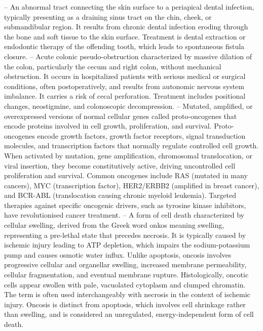 -- An abnormal tract connecting the skin surface to a periapical dental infection, typically presenting as a draining sinus tract on the chin, cheek, or submandibular region. It results from chronic dental infection eroding through the bone and soft tissue to the skin surface. Treatment is dental extraction or endodontic therapy of the offending tooth, which leads to spontaneous fistula closure.
-- Acute colonic pseudo-obstruction characterized by massive dilation of the colon, particularly the cecum and right colon, without mechanical obstruction. It occurs in hospitalized patients with serious medical or surgical conditions, often postoperatively, and results from autonomic nervous system imbalance. It carries a risk of cecal perforation. Treatment includes positional changes, neostigmine, and colonoscopic decompression.
-- Mutated, amplified, or overexpressed versions of normal cellular genes called proto-oncogenes that encode proteins involved in cell growth, proliferation, and survival. Proto-oncogenes encode growth factors, growth factor receptors, signal transduction molecules, and transcription factors that normally regulate controlled cell growth. When activated by mutation, gene amplification, chromosomal translocation, or viral insertion, they become constitutively active, driving uncontrolled cell proliferation and survival. Common oncogenes include RAS (mutated in many cancers), MYC (transcription factor), HER2/ERBB2 (amplified in breast cancer), and BCR-ABL (translocation causing chronic myeloid leukemia). Targeted therapies against specific oncogenic drivers, such as tyrosine kinase inhibitors, have revolutionised cancer treatment.
-- A form of cell death characterized by cellular swelling, derived from the Greek word onkos meaning swelling, representing a pre-lethal state that precedes necrosis. It is typically caused by ischemic injury leading to ATP depletion, which impairs the sodium-potassium pump and causes osmotic water influx. Unlike apoptosis, oncosis involves progressive cellular and organellar swelling, increased membrane permeability, cellular fragmentation, and eventual membrane rupture. Histologically, oncotic cells appear swollen with pale, vacuolated cytoplasm and clumped chromatin. The term is often used interchangeably with necrosis in the context of ischemic injury. Oncosis is distinct from apoptosis, which involves cell shrinkage rather than swelling, and is considered an unregulated, energy-independent form of cell death.
